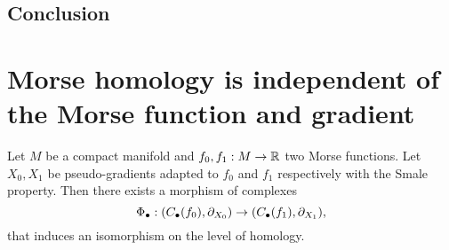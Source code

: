 \subsection{Conclusion}


\filbreak
\section{Morse homology is independent of the Morse function and gradient}
\begin{theorem}
    Let $M$ be a compact manifold and $ f_0, f_1: M \to  \mathbb{R}$ two Morse functions.
    Let $X_0, X_1$ be pseudo-gradients adapted to $f_0$ and $ f_1$ respectively with the Smale property.
    Then there exists a morphism of complexes
    \[
        \Phi_{\bullet}:
        (C_\bullet(f_0), \partial_{X_0}) \to  
        (C_\bullet(f_1), \partial_{X_1})
    ,\] 
    that induces an isomorphism on the level of homology.
\end{theorem}
    
